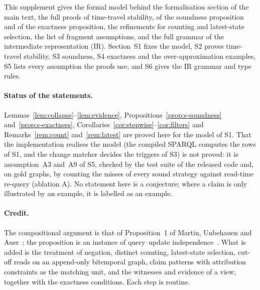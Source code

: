 \noindent This supplement gives the formal model behind the formalisation section of the main
text, the full proofs of time-travel stability, of the soundness proposition and of the
exactness proposition, the refinements for counting and latest-state selection, the list of
fragment assumptions, and the full grammar of the intermediate representation (IR).
Section~S1 fixes the model, S2 proves time-travel stability, S3 soundness, S4 exactness and the
over-approximation examples, S5 lists every assumption the proofs use, and S6 gives the IR
grammar and type rules.

\paragraph{Status of the statements.}
Lemmas~\ref{lem:collapse}--\ref{lem:evidence}, Propositions~\ref{prop:s-soundness}
and~\ref{prop:s-exactness}, Corollaries~\ref{cor:stepwise}--\ref{cor:filters} and
Remarks~\ref{rem:count} and~\ref{rem:latest} are proved here for the model of S1. That the
implementation realises the model (the compiled SPARQL computes the rows of S1, and the change
matcher decides the triggers of S3) is not proved: it is assumption~A3 and~A9 of S5, checked by
the test suite of the released code and, on gold graphs, by counting the misses of every sound
strategy against read-time re-query (ablation A). No statement here is a conjecture; where a
claim is only illustrated by an example, it is labelled as an example.

\paragraph{Credit.}
The compositional argument is that of Proposition~1 of Martin, Unbehauen and
Auer~\cite{martin2010caching}; the proposition is an instance of query--update
independence~\cite{blakeley1986updating,levy1993independent}. What is added is the treatment of
negation, distinct counting, latest-state selection, cut-off reads on an append-only bitemporal
graph, claim patterns with attribution constraints as the matching unit, and the witnesses and
evidence of a view, together with the exactness conditions. Each step is routine.
